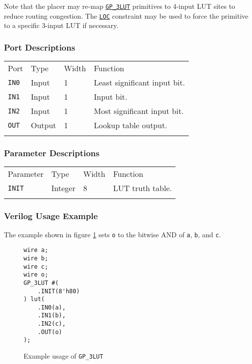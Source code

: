 \documentclass[11pt]{article}
\newcommand{\tokenstyle}[1]{\texttt{#1}}
\newcommand{\wirestyle}[1]{\texttt{#1}}
\newcommand{\whenstyle}[1]{{\fontseries{sb}\selectfont#1}}
\newcommand{\tokenref}[2]{\hyperref[#2]{\tokenstyle{#1}}}
\newcommand{\thinhline}{\Xhline{1\arrayrulewidth}}
\newcommand{\thickhline}{\Xhline{2.5\arrayrulewidth}}
\begin{document}
Note that the placer may re-map \tokenref{GP\_3LUT}{gp-3lut} primitives to 4-input LUT sites to reduce routing
congestion. The \tokenref{LOC}{LOC} constraint may be used to force the primitive to a specific 3-input LUT if
necessary.

\subsubsection{Port Descriptions}

\begin{tabularx}{\textwidth}{lllX}
\thinhline
\whenstyle{Port} & \whenstyle{Type} & \whenstyle{Width} & \whenstyle{Function} \\
\thickhline
\tokenstyle{IN0} & Input & 1 & Least significant input bit. \\
\thinhline
\tokenstyle{IN1} & Input & 1 & Input bit. \\
\thinhline
\tokenstyle{IN2} & Input & 1 & Most significant input bit. \\
\thinhline
\tokenstyle{OUT} & Output & 1 & Lookup table output. \\
\thinhline
\end{tabularx}

\subsubsection{Parameter Descriptions}

\begin{tabularx}{\textwidth}{lllX}
\thinhline
\whenstyle{Parameter} & \whenstyle{Type} & \whenstyle{Width} & \whenstyle{Function} \\
\thickhline
\tokenstyle{INIT} & Integer & 8 & LUT truth table. \\
\thinhline
\end{tabularx}

\subsubsection{Verilog Usage Example}

The example shown in figure \ref{gp-3LUT-example} sets \wirestyle{o} to the bitwise AND of \wirestyle{a}, \wirestyle{b}, and \wirestyle{c}.

\begin{figure}[h]
\begin{lstlisting}
wire a;
wire b;
wire c;
wire o;
GP_3LUT #(
	.INIT(8'h80)
) lut(
	.IN0(a),
	.IN1(b),
	.IN2(c),
	.OUT(o)
);
\end{lstlisting}
\caption{Example usage of \tokenstyle{GP\_3LUT}}
\label{gp-3LUT-example}
\end{figure}
\end{document}
